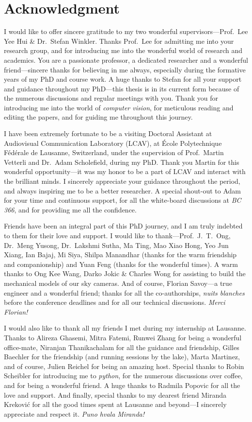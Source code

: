 \chapter*{\centering Acknowledgment}

I would like to offer sincere gratitude to my two wonderful supervisors---Prof.\ Lee Yee Hui \& Dr.\ Stefan Winkler. Thanks Prof.\ Lee for admitting me into your research group, and for introducing me into the wonderful world of research and academics. You are a passionate professor, a dedicated researcher and a wonderful friend---sincere thanks for believing in me always, especially during the formative years of my PhD and course work. A huge thanks to Stefan for all your support and guidance throughout my PhD---this thesis is in its current form because of the numerous discussions and regular meetings with you. Thank you for introducing me into the world of \emph{computer vision}, for meticulous reading and editing the papers, and for guiding me throughout this journey. 

I have been extremely fortunate to be a visiting Doctoral Assistant at Audiovisual Communication Laboratory (LCAV), at \'{E}cole Polytechnique F\'{e}d\'{e}rale de Lausanne, Switzerland, under the supervision of Prof.\ Martin Vetterli and Dr.\ Adam Scholefield, during my PhD. Thank you Martin for this wonderful opportunity---it was my honor to be a part of LCAV and interact with the brilliant minds. I sincerely appreciate your guidance throughout the period, and always inspiring me to be a better researcher. A special shout-out to Adam for your time and continuous support, for all the white-board discussions at \emph{BC 366}, and for providing me all the confidence.

Friends have been an integral part of this PhD journey, and I am truly indebted to them for their love and support. I would like to thank---Prof.\ J.\ T.\ Ong, Dr.\ Meng Yusong, Dr.\ Lakshmi Sutha, Ma Ting, Mao Xiao Hong, Yeo Jun Xiang, Ian Bajaj, Mi Siya, Shilpa Manandhar (thanks for the warm friendship and companionship) and Yuan Feng (thanks for the wonderful times). A warm thanks to Ong Kee Wang, Darko Jokic \& Charles Wong for assisting to build the mechanical models of our sky cameras. And of course, Florian Savoy---a true engineer and a wonderful friend; thanks for all the co-authorships, \emph{nuits blanches} before the conference deadlines and for all our technical discussions. \emph{Merci Florian!}

I would also like to thank all my friends I met during my internship at Lausanne. Thanks to Alireza Ghasemi, Mitra Fatemi, Runwei Zhang for being a wonderful office-mate, Niranjan Thanikachalam for all the guidance and friendship, Gilles Baechler for the friendship (and running sessions by the lake), Marta Martinez, and of course, Julien Reichel for being an amazing host. Special thanks to Robin Scheibler for introducing me to \emph{python}, for the numerous discussions over coffee, and for being a wonderful friend. A huge thanks to Radmila Popovic for all the love and support. And finally, special thanks to my dearest friend Miranda Krekovi{\'c} for all the good times spent at Lausanne and beyond---I sincerely appreciate and respect it. \emph{Puno hvala Miranda!}


